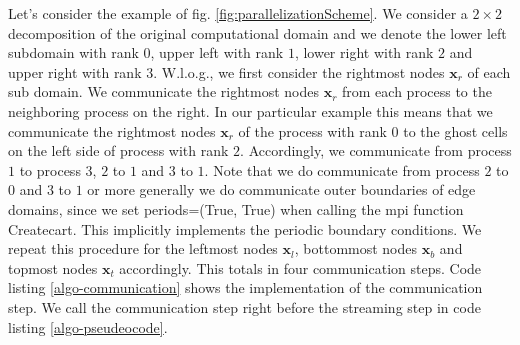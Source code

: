 \documentclass[a4paper,11pt, footsepline]{book}
\begin{document}
Let's consider the example of fig. \ref{fig:parallelizationScheme}. We consider a $2\times 2$ decomposition of the original computational domain and we denote the lower left subdomain with rank $0$, upper left with rank $1$, lower right with rank $2$ and upper right with rank $3$. W.l.o.g., we first consider the rightmost nodes $\mathbf{x}_r$ of each sub domain. We communicate the rightmost nodes $\mathbf{x}_r$ from each process to the neighboring process on the right. In our particular example this means that we communicate the rightmost nodes $\mathbf{x}_r$ of the process with rank $0$ to the ghost cells on the left side of process with rank $2$. Accordingly, we communicate from process $1$ to process $3$, $2$ to $1$ and $3$ to $1$. Note that we do communicate from process $2$ to $0$ and $3$ to $1$ or more generally we do communicate outer boundaries of edge domains, since we set \textsf{periods=(True, True)} when calling the \ac{mpi} function \textsf{Create\textunderscore cart}. This implicitly implements the periodic boundary conditions.
We repeat this procedure for the leftmost nodes $\mathbf{x}_l$, bottommost nodes $\mathbf{x}_b$ and topmost nodes $\mathbf{x}_t$ accordingly. This totals in four communication steps. Code listing \ref{algo-communication} shows the implementation of the communication step. We call the communication step right before the streaming step in code listing \ref{algo-pseudeocode}.
\end{document}
